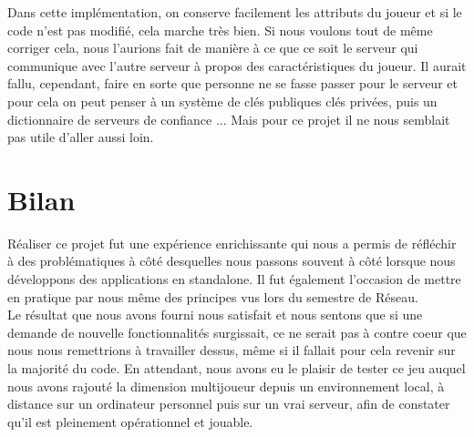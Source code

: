 \documentclass[12pt]{article}
\begin{document}
Dans cette implémentation, on conserve facilement les attributs du joueur et si le code n'est pas modifié, cela marche très bien. Si nous voulons tout de même corriger cela, nous l'aurions fait de manière à ce que ce soit le serveur qui communique avec l'autre serveur à propos des caractéristiques du joueur. Il aurait fallu, cependant, faire en sorte que personne ne se fasse passer pour le serveur et pour cela on peut penser à un système de clés publiques clés privées, puis un dictionnaire de serveurs de confiance ... Mais pour ce projet il ne nous semblait pas utile d'aller aussi loin.
\newpage

\section{Bilan}
Réaliser ce projet fut une expérience enrichissante qui nous a permis de réfléchir à des problématiques à côté desquelles nous passons souvent à côté lorsque nous développons des applications en standalone. Il fut également l'occasion de mettre en pratique par nous même des principes vus lors du semestre de Réseau.
\\

Le résultat que nous avons fourni nous satisfait et nous sentons que si une demande de nouvelle fonctionnalités surgissait, ce ne serait pas à contre coeur que nous nous remettrions à travailler dessus, même si il fallait pour cela revenir sur la majorité du code. En attendant, nous avons eu le plaisir de tester ce jeu auquel nous avons rajouté la dimension multijoueur depuis un environnement local, à distance sur un ordinateur personnel puis sur un vrai serveur, afin de constater qu'il est pleinement opérationnel et jouable.
\end{document}
